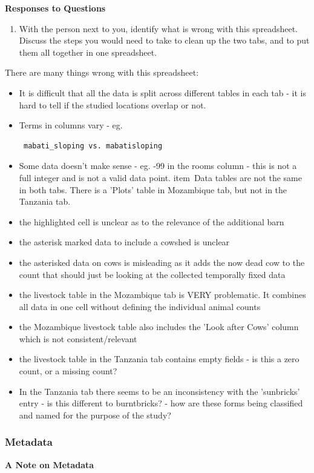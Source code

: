 \documentclass{article}
\begin{document}
\textbf{Responses to Questions}

\begin{enumerate}
    \item With the person next to you, identify what is wrong with this spreadsheet. Discuss the steps you would need to take to clean up the two tabs, and to put them all together in one spreadsheet.
\end{enumerate} 

There are many things wrong with this spreadsheet:
\begin{itemize}
    \item It is difficult that all the data is split across different tables in each tab - it is hard to tell if the studied locations overlap or not. 
    \item Terms in columns vary - eg. \begin{verbatim} mabati_sloping vs. mabatisloping
    \end{verbatim}
    \item Some data doesn't make sense - eg. -99 in the rooms column - this is not a full integer and is not a valid data point. 
    item\ Data tables are not the same in both tabs. There is a 'Plots' table in Mozambique tab, but not in the Tanzania tab.
    \item the highlighted cell is unclear as to the relevance of the additional barn
    \item the asterisk marked data to include a cowshed is unclear
    \item the asterisked data on cows is misleading as it adds the now dead cow to the count that should just be looking at the collected temporally fixed data
    \item the livestock table in the Mozambique tab is VERY problematic. It combines all data in one cell without defining the individual animal counts
    \item the Mozambique livestock table also includes the 'Look after Cows' column which is not consistent/relevant
    \item the livestock table in the Tanzania tab contains empty fields - is this a zero count, or a missing count?
    \item In the Tanzania tab there seems to be an inconsistency with the 'sunbricks' entry - is this different to burntbricks? - how are these forms being classified and named for the purpose of the study?
    \end{itemize}

\subsubsection{Metadata}
\textbf{A Note on Metadata}
\end{document}
